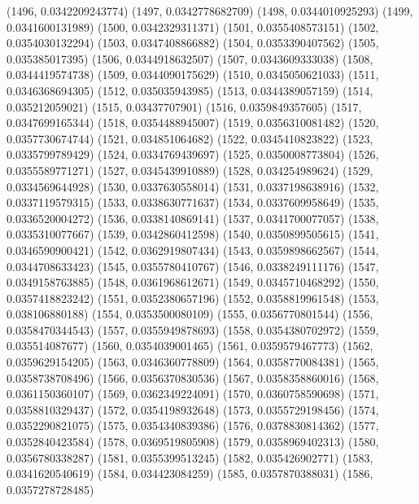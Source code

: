 {					(1496, 0.0342209243774)
					(1497, 0.0342778682709)
					(1498, 0.0344010925293)
					(1499, 0.0341600131989)
					(1500, 0.0342329311371)
					(1501, 0.0355408573151)
					(1502, 0.0354030132294)
					(1503, 0.0347408866882)
					(1504, 0.0353390407562)
					(1505, 0.035385017395)
					(1506, 0.0344918632507)
					(1507, 0.0343609333038)
					(1508, 0.0344419574738)
					(1509, 0.0344090175629)
					(1510, 0.0345050621033)
					(1511, 0.0346368694305)
					(1512, 0.035035943985)
					(1513, 0.0344389057159)
					(1514, 0.035212059021)
					(1515, 0.03437707901)
					(1516, 0.0359849357605)
					(1517, 0.0347699165344)
					(1518, 0.0354488945007)
					(1519, 0.0356310081482)
					(1520, 0.0357730674744)
					(1521, 0.034851064682)
					(1522, 0.0345410823822)
					(1523, 0.0335799789429)
					(1524, 0.0334769439697)
					(1525, 0.0350008773804)
					(1526, 0.0355589771271)
					(1527, 0.0345439910889)
					(1528, 0.034254989624)
					(1529, 0.0334569644928)
					(1530, 0.0337630558014)
					(1531, 0.0337198638916)
					(1532, 0.0337119579315)
					(1533, 0.0338630771637)
					(1534, 0.0337609958649)
					(1535, 0.0336520004272)
					(1536, 0.0338140869141)
					(1537, 0.0341700077057)
					(1538, 0.0335310077667)
					(1539, 0.0342860412598)
					(1540, 0.0350899505615)
					(1541, 0.0346590900421)
					(1542, 0.0362919807434)
					(1543, 0.0359898662567)
					(1544, 0.0344708633423)
					(1545, 0.0355780410767)
					(1546, 0.0338249111176)
					(1547, 0.0349158763885)
					(1548, 0.0361968612671)
					(1549, 0.0345710468292)
					(1550, 0.0357418823242)
					(1551, 0.0352380657196)
					(1552, 0.0358819961548)
					(1553, 0.038106880188)
					(1554, 0.0353500080109)
					(1555, 0.0356770801544)
					(1556, 0.0358470344543)
					(1557, 0.0355949878693)
					(1558, 0.0354380702972)
					(1559, 0.035514087677)
					(1560, 0.0354039001465)
					(1561, 0.0359579467773)
					(1562, 0.0359629154205)
					(1563, 0.0346360778809)
					(1564, 0.0358770084381)
					(1565, 0.0358738708496)
					(1566, 0.0356370830536)
					(1567, 0.0358358860016)
					(1568, 0.0361150360107)
					(1569, 0.0362349224091)
					(1570, 0.0360758590698)
					(1571, 0.0358810329437)
					(1572, 0.0354198932648)
					(1573, 0.0355729198456)
					(1574, 0.0352290821075)
					(1575, 0.0354340839386)
					(1576, 0.0378830814362)
					(1577, 0.0352840423584)
					(1578, 0.0369519805908)
					(1579, 0.0358969402313)
					(1580, 0.0356780338287)
					(1581, 0.0355399513245)
					(1582, 0.035426902771)
					(1583, 0.0341620540619)
					(1584, 0.034423084259)
					(1585, 0.0357870388031)
					(1586, 0.0357278728485)
}
